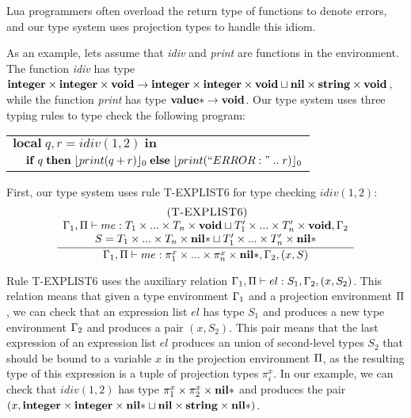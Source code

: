 Lua programmers often overload the return type of functions to denote errors,
and our type system uses projection types to handle this idiom.

As an example, lets assume that \emph{idiv} and \emph{print} are functions
in the environment.
The function \emph{idiv} has type
$\mathbf{integer} \times \mathbf{integer} \times \mathbf{void} \rightarrow \mathbf{integer} \times \mathbf{integer} \times \mathbf{void} \sqcup \mathbf{nil} \times \mathbf{string} \times \mathbf{void}$,
while the function \emph{print} has type
$\mathbf{value}{*} \rightarrow \mathbf{void}$.
Our type system uses three typing rules to type check the following program:
\begin{center}
\begin{tabular}{ll}
\multicolumn{2}{l}{$\mathbf{local} \; q, r = idiv(1, 2) \; \mathbf{in}$}\\
& \multicolumn{1}{l}{$\mathbf{if} \; q \; \mathbf{then} \; \lfloor print(q + r) \rfloor_{0} \; \mathbf{else} \; \lfloor print(``ERROR: " \; .. \; r) \rfloor_{0}$}
\end{tabular}
\end{center}

First, our type system uses rule \textsc{T-EXPLIST6} for type checking
$idiv(1, 2)$:
\[
\begin{array}{c}
\; (\textsc{T-EXPLIST6})\\
\dfrac{\begin{array}{c}
       \Gamma_{1}, \Pi \vdash me:T_{1} \times ... \times T_{n} \times \mathbf{void} \sqcup T_{1}' \times ... \times T_{n}' \times \mathbf{void}, \Gamma_{2}\\
       S = T_{1} \times ... \times T_{n} \times \mathbf{nil}{*} \sqcup T_{1}' \times ... \times T_{n}' \times \mathbf{nil}{*}
       \end{array}}
      {\Gamma_{1}, \Pi \vdash me:\pi_{1}^{x} \times ... \times \pi_{n}^{x} \times \mathbf{nil}{*}, \Gamma_{2}, (x,S)}
\end{array}
\]

Rule \textsc{T-EXPLIST6} uses the auxiliary relation
$\Gamma_{1}, \Pi \vdash el : S_{1}, \Gamma_{2}, (x,S_{2})$.
This relation means that given a type environment $\Gamma_{1}$ and
a projection environment $\Pi$, we can check that an expression
list $el$ has type $S_{1}$ and produces a new type environment $\Gamma_{2}$
and produces a pair $(x,S_{2})$.
This pair means that the last expression of an expression list $el$
produces an union of second-level types $S_{2}$ that should be bound
to a variable $x$ in the projection environment $\Pi$,
as the resulting type of this expression is a tuple of projection
types $\pi_{i}^{x}$.
In our example, we can check that $idiv(1, 2)$ has type
$\pi_{1}^{x} \times \pi_{2}^{x} \times \mathbf{nil}{*}$ and produces the pair
$(x,\mathbf{integer} \times \mathbf{integer} \times \mathbf{nil}{*} \sqcup \mathbf{nil} \times \mathbf{string} \times \mathbf{nil}{*})$. 

